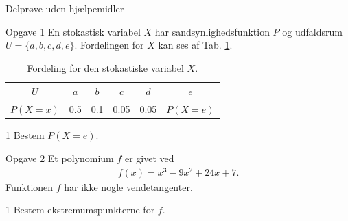 \documentclass[12pt,x11names,a4paper]{article}
\begin{document}
\newpage

\begin{center}
\LARGE
Delprøve uden hjælpemidler 
\end{center}
\begin{opgavetekst}{Opgave 1}
	En stokastisk variabel $X$ har sandsynlighedsfunktion $P$ og udfaldsrum  \\
	$U = \{a,b,c,d,e\}$. Fordelingen for $X$ 
	kan ses af Tab. \ref{tab:fordeling}.
	\begin{table}[H]
		\centering
		\begin{tabular}{c|c|c|c|c|c}
			$U$ & $a$ & $b$ &  $c$ & $d$ & $e$ \\
			\hline
			$P(X=x)$ & 0.5 & 0.1 & 0.05 & 0.05 & $P(X=e)$
		\end{tabular}
		\caption{Fordeling for den stokastiske variabel $X$. }
		\label{tab:fordeling}		
	\end{table}
	\phantom{h}
\end{opgavetekst}
	\begin{delopgave}{}{1}
		Bestem $P(X=e)$.
	\end{delopgave}

\begin{opgavetekst}{Opgave 2}
	Et polynomium $f$ er givet ved
	\begin{align*}
		f(x) = x^3-9x^2+24x+7.
	\end{align*}
	Funktionen $f$ har ikke nogle vendetangenter.
\end{opgavetekst}
\begin{delopgave}{}{1}
	Bestem ekstremumspunkterne for $f$. 
\end{delopgave}
\end{document}
